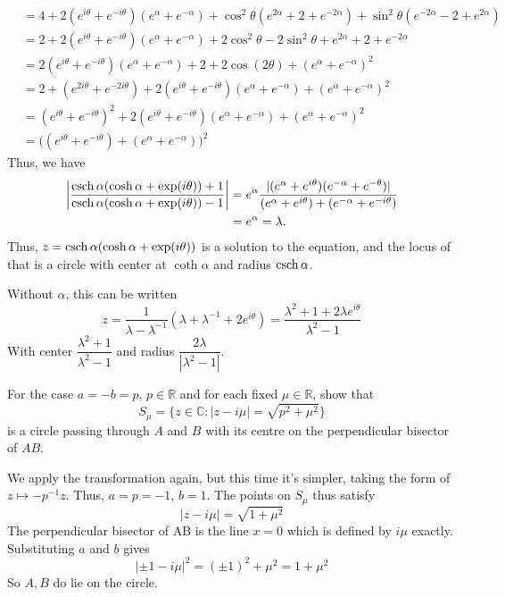 \documentclass[12pt]{article}
\begin{document}
\begin{answer}
\begin{align*}
            &= 4 + 2(e^{i\theta}+e^{-i\theta})(e^{\alpha}+e^{-\alpha}) + \cos^{2}\theta(e^{2\alpha} + 2 + e^{-2\alpha}) + \sin^{2}\theta(e^{-2\alpha} - 2 + e^{2\alpha})\\
            &= 2 + 2(e^{i\theta}+e^{-i\theta})(e^{\alpha}+e^{-\alpha}) + 2\cos^{2}\theta - 2\sin^{2}\theta + e^{2\alpha} + 2 + e^{-2\alpha}\\
            &= 2(e^{i\theta}+e^{-i\theta})(e^{\alpha}+e^{-\alpha}) + 2 + 2\cos(2\theta) + (e^{\alpha} + e^{-\alpha})^{2}\\
            &= 2 + (e^{2i\theta} + e^{-2i\theta}) + 2(e^{i\theta}+e^{-i\theta})(e^{\alpha}+e^{-\alpha}) + (e^{\alpha} + e^{-\alpha})^{2}\\
            &= (e^{i\theta} + e^{-i\theta})^{2} + 2(e^{i\theta}+e^{-i\theta})(e^{\alpha}+e^{-\alpha}) + (e^{\alpha} + e^{-\alpha})^{2}\\
            &= \biggl((e^{i\theta} + e^{-i\theta}) + (e^{\alpha} + e^{-\alpha})\biggr)^{2}
        \end{align*}
        Thus, we have
        \begin{align*}
            \left|\frac{\operatorname{csch}\alpha(\cosh\alpha+\exp(i\theta))+1}{\operatorname{csch}\alpha(\cosh\alpha+\exp(i\theta))-1}\right|
            &= e^{\alpha}\frac{|(e^{\alpha}+e^{i\theta})(e^{-\alpha}+e^{-\theta})|}{(e^{\alpha}+e^{i\theta})+(e^{-\alpha}+e^{-i\theta})}\\
            &= e^{\alpha} = \lambda.
        \end{align*}
        Thus, $z=\operatorname{csch}\alpha(\cosh\alpha+\exp(i\theta))$ is a solution
        to the equation, and the locus of that
        is a circle with center at $\coth\alpha$ and radius $\operatorname{csch}\alpha$.

        Without $\alpha$, this can be written
        \[
        z = \frac{1}{\lambda-\lambda^{-1}}(\lambda+\lambda^{-1}+2e^{i\theta})
         = \frac{\lambda^{2}+1+2\lambda e^{i\theta}}{\lambda^{2}-1}
         \]
         With center $\dfrac{\lambda^{2}+1}{\lambda^{2}-1}$ and
         radius $\dfrac{2\lambda}{|\lambda^{2}-1|}$.
    \end{answer}

    \begin{subquestion}
        For the case $a = -b = p$, $p \in \mathbb{R}$ and for each fixed $\mu\in\mathbb{R}$,
        show that
        \[
        S_\mu = \{z \in \mathbb{C} : |z - i\mu| = \sqrt{p^{2} + \mu^{2}}\}
        \]
        is a circle passing through $A$ and $B$ with its centre on the
        perpendicular bisector of $AB$.
    \end{subquestion}
    \begin{answer}
        We apply the transformation again,
        but this time it's simpler, taking the form of $z \mapsto -p^{-1}z$.
        Thus, $a=p=-1$, $b=1$.
        The points on $S_\mu$ thus satisfy
        \[
        |z - i\mu| = \sqrt{1 + \mu^{2}}
        \]
        The perpendicular bisector of AB is the line $x=0$ which
        is defined by $i\mu$ exactly. Substituting $a$ and $b$ gives
        \[
            |\pm 1 - i\mu|^{2}
            = (\pm 1)^{2} + \mu^{2}
            = 1 + \mu^{2}
        \]
        So $A,B$ do lie on the circle.
    \end{answer}
\end{document}
